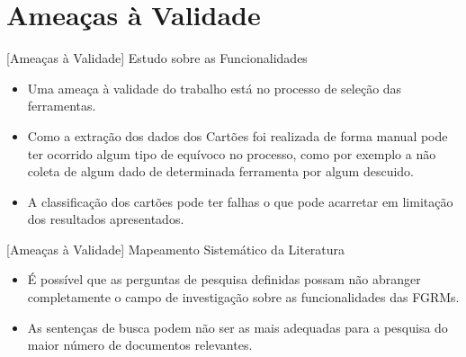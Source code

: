 \documentclass[t,14pt,mathserif]{beamer}
\begin{document}
\section{Ameaças à Validade}

\begin{frame}{[Ameaças à Validade] Estudo sobre as Funcionalidades}
    \begin{itemize}

        \item Uma ameaça à validade do trabalho está no processo de seleção das
            ferramentas.

        \item Como a extração dos dados dos Cartões foi realizada de forma
            manual pode ter ocorrido algum tipo de equívoco no processo, como
            por exemplo a não coleta de algum dado de determinada ferramenta por
            algum descuido.

        \item A classificação dos cartões pode ter falhas o que pode acarretar
              em limitação dos resultados apresentados.

    \end{itemize}

\end{frame}

\begin{frame}{[Ameaças à Validade] Mapeamento Sistemático da Literatura}
    \begin{itemize}

        \item É possível que as perguntas de pesquisa definidas possam não
              abranger completamente o campo de investigação sobre as
              funcionalidades das FGRMs.

        \item As sentenças de busca podem não ser as mais adequadas para a
              pesquisa do maior número de documentos relevantes.

    \end{itemize}
\end{frame}
\end{document}
